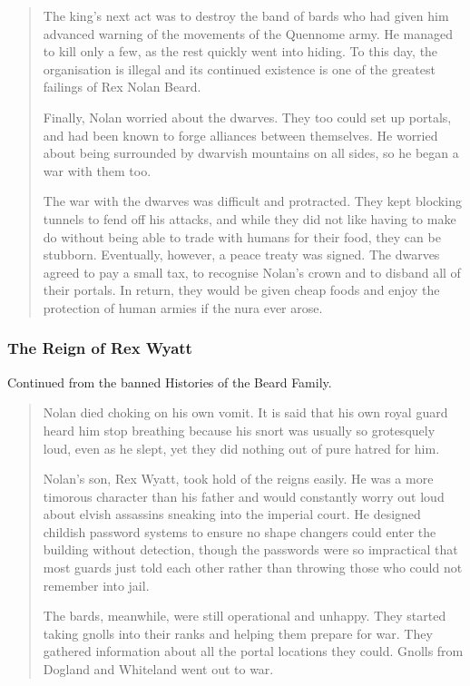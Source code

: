 \begin{multicols}{2}
\begin{quotation}
	The king's next act was to destroy the band of bards who had given him advanced warning of the movements of the Quennome army.
	He managed to kill only a few, as the rest quickly went into hiding.
	To this day, the organisation is illegal and its continued existence is one of the greatest failings of Rex Nolan Beard.

	Finally, Nolan worried about the dwarves.
	They too could set up portals, and had been known to forge alliances between themselves.
	He worried about being surrounded by dwarvish mountains on all sides, so he began a war with them too.

	The war with the dwarves was difficult and protracted.
	They kept blocking tunnels to fend off his attacks, and while they did not like having to make do without being able to trade with humans for their food, they can be stubborn.
	Eventually, however, a peace treaty was signed.
	The dwarves agreed to pay a small tax, to recognise Nolan's crown and to disband all of their portals.
	In return, they would be given cheap foods and enjoy the protection of human armies if the nura ever arose.

\end{quotation}


\subsubsection{The Reign of Rex Wyatt}

Continued from the banned Histories of the Beard Family.

\begin{quotation}

	Nolan died choking on his own vomit.
	It is said that his own royal guard heard him stop breathing because his snort was usually so grotesquely loud, even as he slept, yet they did nothing out of pure hatred for him.

	Nolan's son, Rex Wyatt, took hold of the reigns easily.
	He was a more timorous character than his father and would constantly worry out loud about elvish assassins sneaking into the imperial court.
	He designed childish password systems to ensure no shape changers could enter the building without detection, though the passwords were so impractical that most guards just told each other rather than throwing those who could not remember into jail.

	The bards, meanwhile, were still operational and unhappy.
	They started taking gnolls into their ranks and helping them prepare for war.
	They gathered information about all the portal locations they could.
	Gnolls from Dogland and Whiteland went out to war.


\end{quotation}
\end{multicols}
